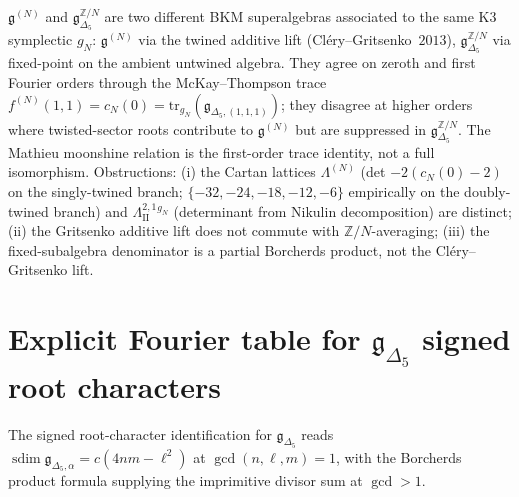 \begin{remark}
\label{rem:k3e-independent-fgDel-fixed}
$\mathfrak{g}^{(N)}$ and $\mathfrak{g}_{\Delta_5}^{\mathbb{Z}/N}$ are two different BKM superalgebras associated to the same K3 symplectic $g_N$: $\mathfrak{g}^{(N)}$ via the twined additive lift (Cl\'ery--Gritsenko~$2013$), $\mathfrak{g}_{\Delta_5}^{\mathbb{Z}/N}$ via fixed-point on the ambient untwined algebra. They agree on zeroth and first Fourier orders through the McKay--Thompson trace $f^{(N)}(1, 1) = c_N(0) = \mathrm{tr}_{g_N}(\mathfrak{g}_{\Delta_5, (1, 1, 1)})$; they disagree at higher orders where twisted-sector roots contribute to $\mathfrak{g}^{(N)}$ but are suppressed in $\mathfrak{g}_{\Delta_5}^{\mathbb{Z}/N}$. The Mathieu moonshine relation is the first-order trace identity, not a full isomorphism. Obstructions: (i) the Cartan lattices $\Lambda^{(N)}$ (det $-2(c_N(0) - 2)$ on the singly-twined branch; $\{-32, -24, -18, -12, -6\}$ empirically on the doubly-twined branch) and $\Lambda^{2, 1}_{\mathrm{II}}{}^{g_N}$ (determinant from Nikulin decomposition) are distinct; (ii) the Gritsenko additive lift does not commute with $\mathbb{Z}/N$-averaging; (iii) the fixed-subalgebra denominator is a partial Borcherds product, not the Cl\'ery--Gritsenko lift.
\end{remark}

\section{Explicit Fourier table for \texorpdfstring{$\mathfrak{g}_{\Delta_5}$}{g-Delta-5} signed root characters}
\label{sec:k3e-fourier-mult-table}

The signed root-character identification for $\mathfrak{g}_{\Delta_5}$ reads \(\operatorname{sdim}\mathfrak g_{\Delta_5,\alpha} = c(4 n m - \ell^2)\) at $\gcd(n, \ell, m) = 1$, with the Borcherds product formula supplying the imprimitive divisor sum at $\gcd > 1$.

